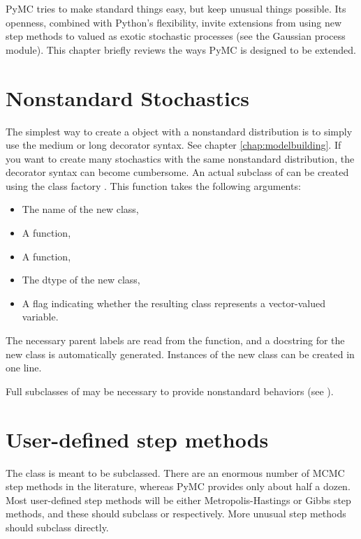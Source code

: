 PyMC tries to make standard things easy, but keep unusual things possible. Its openness, combined with Python's flexibility, invite extensions from using new step methods to  valued as exotic stochastic processes (see the Gaussian process module). This chapter briefly reviews the ways PyMC is designed to be extended. 

\hypertarget{nonstandard}{}
\section*{Nonstandard Stochastics} \label{nonstandard}

The simplest way to create a  object with a nonstandard distribution is to simply use the medium or long decorator syntax. See chapter \ref{chap:modelbuilding}. If you want to create many stochastics with the same nonstandard distribution, the decorator syntax can become cumbersome. An actual subclass of  can be created using the class factory . This function takes the following arguments:
\begin{itemize}
   \item The name of the new class,
   \item A  function,
   \item A  function,
   \item The dtype of the new class,
   \item A flag indicating whether the resulting class represents a vector-valued variable.
\end{itemize}
The necessary parent labels are read from the  function, and a docstring for the new class is automatically generated. Instances of the new class can be created in one line.

Full subclasses of  may be necessary to provide nonstandard behaviors (see ).

\hypertarget{custom-stepper}{}
\section*{User-defined step methods} \label{custom-stepper}
The  class is meant to be subclassed. There are an enormous number of MCMC step methods in the literature, whereas PyMC provides only about half a dozen. Most user-defined step methods will be either Metropolis-Hastings or Gibbs step methods, and these should subclass  or  respectively. More unusual step methods should subclass  directly.

